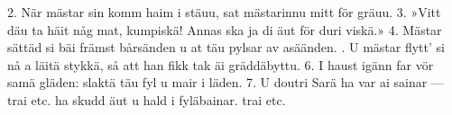 \begin{multicols}{2}
2.  När mästar sin komm haim i stäuu,
    sat mästarinnu mitt för gräuu.
3.  »Vitt däu ta häit någ mat, kumpiskä!
    Annas ska ja di äut för duri viskä.»
4.  Mästar sättäd si bäi främst bårsänden
    u at täu pylsar av asäänden.
\vfill{}.  U mästar flytt’ si nå a läitä stykkä,
    så att han fikk tak äi gräddäbyttu.
6.  I haust igänn far vör samä gläden:
    slaktä täu fyl u mair i läden.
7.  U doutri Sarä ha var ai sainar —
    \qquad{}trai etc.
    ha skudd äut u hald i fyläbainar.
    \qquad{}trai etc.
\end{multicols}

